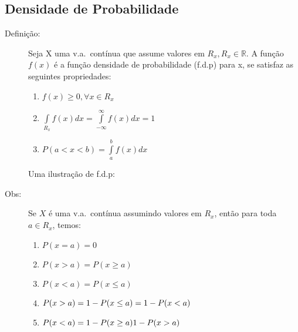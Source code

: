    \subsection{Densidade de Probabilidade}
   \begin{description}
     \item [Definição:] Seja X uma v.a.\ contínua que assume valores em $R_{x},R_{x} \in \mathbb{R}$.
       A função $f(x)$ é a função densidade de probabilidade (f.d.p) para x, se satisfaz as 
       seguintes propriedades: 

       \begin{enumerate}[label=(\roman*)]
         \item $f(x)\geq 0, \forall x \in R_{x}$
         \item $\int \limits_{R_{x}} f(x) dx=\int \limits_{-\infty}^{\infty} f(x)dx=1 $
         \item $P(a<x<b)=\int \limits^b_a f(x) dx $
       \end{enumerate}
       Uma ilustração de f.d.p: 
       \begin{figure}[htpb]
         \centering
         
         \caption{}
         \label{fig:25}

       \end{figure}
     \item [Obs:] Se $X$ é uma v.a.\ contínua assumindo valores em $R_{x}$, então para toda 
       $a \in R_{x}$, temos: 

       \begin{enumerate}[label=(\alph*)]

         \item $P(x=a)=0$
         \item $P(x>a)=P(x\geq a)$
         \item $P(x<a)=P(x\leq a)$
         \item $P(x>a)=1- P(x \leq a)\\ = 1-P(x<a)$
         \item $P(x<a)=1-P(x \geq a)\\ 1-P(x>a)$

       \end{enumerate}

\end{description}
